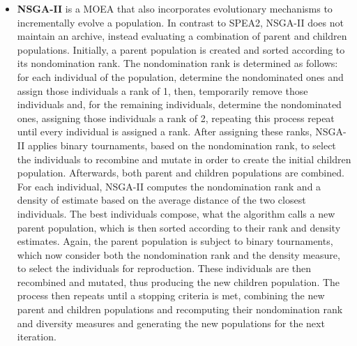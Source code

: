 \begin{itemize}
	\item \textbf{NSGA-II} \cite{Deb2002} is a \ac{MOEA} that also incorporates evolutionary mechanisms to incrementally evolve a population. In contrast to SPEA2, NSGA-II does not maintain an archive, instead evaluating a combination of parent and children populations. Initially, a parent population is created and sorted according to its nondomination rank. The nondomination rank is determined as follows: for each individual of the population, determine the nondominated ones and assign those individuals a rank of 1, then, temporarily remove those individuals and, for the remaining individuals, determine the nondominated ones, assigning those individuals a rank of 2, repeating this process repeat until every individual is assigned a rank. After assigning these ranks, NSGA-II applies binary tournaments, based on the nondomination rank, to select the individuals to recombine and mutate in order to create the initial children population. Afterwards, both parent and children populations are combined. For each individual, NSGA-II computes the nondomination rank and a density of estimate based on the average distance of the two closest individuals. The best individuals compose, what the algorithm calls a new parent population, which is then sorted according to their rank and density estimates. Again, the parent population is subject to binary tournaments, which now consider both the nondomination rank and the density measure, to select the individuals for reproduction. These individuals are then recombined and mutated, thus producing the new children population. The process then repeats until a stopping criteria is met, combining the new parent and children populations and recomputing their nondomination rank and diversity measures and generating the new populations for the next iteration.
	

\end{itemize}
